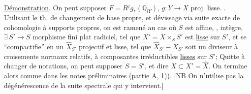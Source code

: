 
\uline{Démonstration}. On  peut supposer $F=R^j g_*(\mathbb Q_{lY})$, $g:Y\longrightarrow X$ proj. lisse. . Utilisant le th. de changement de base propre,  et dévissage via suite exacte de cohomologie à supports propres, on est ramené au cas où  $S$ est affine, , intègre,  $\exists\,S'\longrightarrow S$ morphisme fini plat radiciel, tel que $X' = X\times_S S'$ est \uline{lisse} sur $S'$, et se ``compactifie'' en un $\widehat X_{S'}$  projectif et lisse, tel que $\widehat X_{S'}-X_{S'}$ soit un diviseur à croisements normaux relatifs, à composantes irréductibles \uline{lisses} sur $S'$;  Quitte à changer de notations, on peut supposer $S=S'$, et dire $X\subset X'=\widehat X$. On termine alors  comme dans les notes préliminaires (partie A, 1)). [\uline{NB} On n'utilise pas la dégénérescence de la suite spectrale qui y intervient.]

